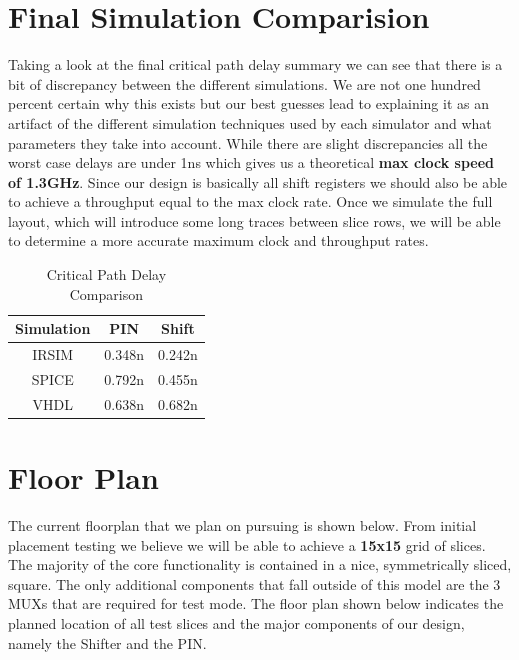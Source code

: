\newpage
\section{Final Simulation Comparision}

    Taking a look at the final critical path delay summary we can see that
    there is a bit of discrepancy between the different simulations. We are not
    one hundred percent certain why this exists but our best guesses lead to
    explaining it as an artifact of the different simulation techniques used by
    each simulator and what parameters they take into account. While there are
    slight discrepancies all the worst case delays are under 1ns which gives us
    a theoretical \textbf{max clock speed of 1.3GHz}. Since our design is
    basically all shift registers we should also be able to achieve a
    throughput equal to the max clock rate. Once we simulate the full layout,
    which will introduce some long traces between slice rows, we will be able
    to determine a more accurate maximum clock and throughput rates.

    \vspace{\baselineskip}

    \begin{table}[H]
        \centering
        \begin{tabular}{ccc}
            \toprule
            \textbf{Simulation} & \textbf{PIN} & \textbf{Shift} \\
            \midrule
            IRSIM & 0.348n & 0.242n \\
            SPICE & 0.792n & 0.455n \\
            VHDL  & 0.638n & 0.682n \\
            \bottomrule
        \end{tabular}
        \caption{Critical Path Delay Comparison}
    \end{table}

\newpage
\section{Floor Plan}

    The current floorplan that we plan on pursuing is shown below. From initial
    placement testing we believe we will be able to achieve a \textbf{15x15}
    grid of slices. The majority of the core functionality is contained in a
    nice, symmetrically sliced, square. The only additional components that
    fall outside of this model are the 3 MUXs that are required for test mode.
    The floor plan shown below indicates the planned location of all test
    slices and the major components of our design, namely the Shifter and the
    PIN.
    \vspace{\baselineskip}

